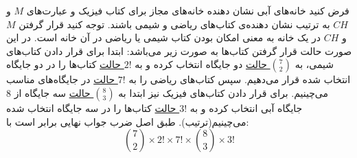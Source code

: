 \p
 فرض کنید خانه‌های آبی نشان دهنده خانه‌های مجاز برای کتاب فیزیک و عبارت‌های 
 $M$ و $CH$
 به ترتیب نشان دهنده‌ی کتاب‌های ریاضی و شیمی باشند.
  توجه کنید قرار گرفتن 
 $M$ و $CH$
در یک خانه به معنی امکان بودن کتاب شیمی یا ریاضی در آن خانه است. 
 در این صورت حالت قرار گرفتن کتاب‌ها به صورت زیر می‌باشد:
ابتدا برای قرار دادن کتاب‌های شیمی، به
\underline{${7\choose 2}$ حالت}
دو جایگاه انتخاب کرده و به 
 \underline{$2!$ حالت}
 کتاب‌ها را در دو جایگاه انتخاب شده قرار می‌دهیم.
 سپس کتاب‌‌های ریاضی را به
 \underline{$7!$ حالت}
 در جایگاه‌های مناسب
 می‌چینیم.
 برای قرار دادن کتاب‌های فیزیک نیز ابتدا به
 \underline{${8\choose 3}$ حالت}
 سه جایگاه از 8 جایگاه آبی انتخاب کرده و 
 به 
 \underline{$3!$ حالت}
 کتاب‌ها را در سه جایگاه انتخاب شده می‌چینیم(ترتیب).
  طبق اصل ضرب جواب نهایی برابر است با:
$${7\choose 2}\times 2!\times7! \times {8\choose 3}\times 3!$$